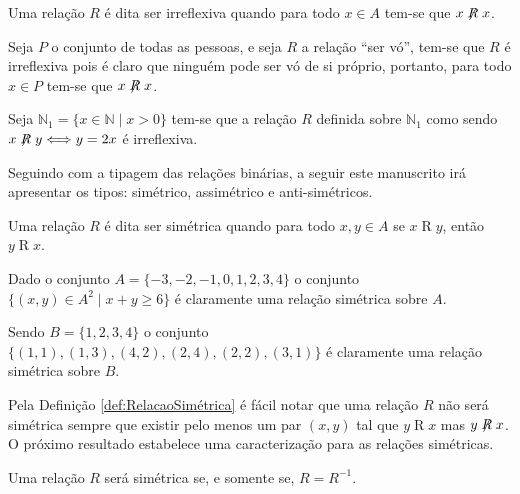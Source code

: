 \begin{definition}\label{def:RelacaoIrreflexiva}
	Uma relação $R$ é dita ser irreflexiva quando para todo $x \in A$ tem-se que $x \centernot{R} x$.
\end{definition}

\begin{example}
	Seja $P$ o conjunto de todas as pessoas, e seja $R$ a relação ``ser vó'', tem-se que $R$ é irreflexiva pois é claro que ninguém pode ser vó de si próprio, portanto, para todo $x \in P$ tem-se que $x \centernot{R} x$.
\end{example}

\begin{example}
	Seja $\mathbb{N}_1 = \{x \in \mathbb{N} \mid x > 0\}$ tem-se que a relação $R$ definida sobre $\mathbb{N}_1$ como sendo $x \centernot{R} y \Longleftrightarrow y = 2x$ é irreflexiva.
\end{example}

Seguindo com a tipagem das relações binárias,  a seguir este manuscrito irá apresentar os tipos: simétrico, assimétrico e anti-simétricos.

\begin{definition}\label{def:RelacaoSimétrica}
	Uma relação $R$ é dita ser simétrica quando para todo $x, y \in A$ se $x \mathrel{R} y$, então $y \mathrel{R} x$.
\end{definition}

\begin{example}
	Dado o conjunto $A = \{-3, -2, -1, 0, 1, 2, 3, 4\}$ o conjunto $\{(x, y) \in A^2 \mid x + y \geq 6\}$ é claramente uma relação simétrica sobre $A$.
\end{example}

\begin{example}
	Sendo $B = \{1, 2, 3, 4\}$ o conjunto $\{(1, 1), (1, 3), (4, 2), (2, 4), (2, 2), (3, 1)\}$ é claramente uma relação simétrica sobre $B$.
\end{example}

Pela Definição \ref{def:RelacaoSimétrica} é fácil notar que uma relação $R$ não será simétrica sempre que existir pelo menos um par $(x, y)$ tal que $y \mathrel{R} x$ mas $y \centernot{R} x$. O próximo resultado estabelece uma caracterização para as relações simétricas.

\begin{theorem}\label{teo:CaracterizacaoRelacaoSimetricas}
	Uma relação $R$ será simétrica se, e somente se, $R = R^{-1}$.
\end{theorem}

